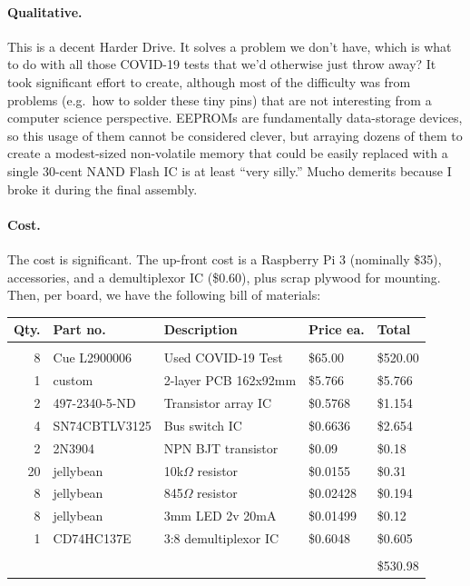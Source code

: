 \documentclass[twocolumn]{article}
\begin{document}
\paragraph{Qualitative.} This is a decent Harder Drive. It solves a problem
we don't have, which is what to do with all those COVID-19 tests that
we'd otherwise just throw away? It took significant effort to create,
although most of the difficulty was from problems (e.g.~how to solder
these tiny pins) that are not interesting from a computer science
perspective. EEPROMs are fundamentally data-storage devices, so this
usage of them cannot be considered clever, but arraying dozens of
them to create a modest-sized non-volatile memory that could be easily
replaced with a single 30-cent NAND Flash IC is at least ``very silly.''
Mucho demerits because I broke it during the final assembly.

\paragraph{Cost.} The cost is significant. The up-front cost is
a Raspberry Pi 3 (nominally \$35), accessories, and a demultiplexor IC
(\$0.60), plus scrap plywood for mounting. Then, per board, we have
the following bill of materials:

\smallskip
{
  \renewcommand{\tabcolsep}{2pt}  
  \scriptsize
  \noindent
  \centering
\begin{tabular}{@{}rllll@{}}
{\bf Qty.} & {\bf Part no.}  & {\bf Description}  & {\bf Price ea.} & {\bf Total}   \\
\hline
& & & & \\[-0.5em]
8    & Cue L2900006  & Used COVID-19 Test     & \$65.00     & \$520.00 \\
1    & custom        & 2-layer PCB 162x92mm   & \$5.766     & \$5.766 \\
2    & 497-2340-5-ND & Transistor array IC    & \$0.5768    & \$1.154 \\
4    & SN74CBTLV3125 & Bus switch IC          & \$0.6636    & \$2.654 \\
2    & 2N3904        & NPN BJT transistor     & \$0.09      & \$0.18 \\
20   & jellybean     & 10k$\Omega$ resistor   & \$0.0155    & \$0.31  \\
8    & jellybean     & 845$\Omega$ resistor   & \$0.02428   & \$0.194 \\
8    & jellybean     & 3mm LED 2v 20mA        & \$0.01499   & \$0.12  \\
1    & CD74HC137E    & 3:8 demultiplexor IC   & \$0.6048    & \$0.605 \\
\hline
& & & & \\[-0.5em]
&               &                      &    & {\normalsize \$530.98} \\
\end{tabular}
  \renewcommand{\tabcolsep}{6pt}  
}
\smallskip
\end{document}
